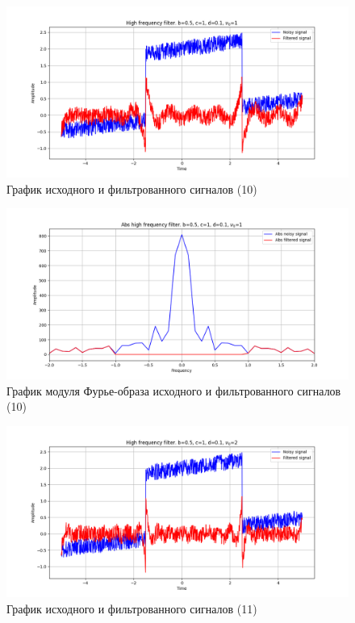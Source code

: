 \documentclass[a4paper, 12pt]{article}
\begin{document}
    \begin{figure}[!htb]
        \centering
        \includegraphics[scale=0.48]{10_u_flt_u_nolow.png}
        \captionsetup{skip=0pt}
        \caption{График исходного и фильтрованного сигналов (10)}
        \label{fig:fig45}
    \end{figure}
    \begin{figure}[!htb]
        \centering
        \includegraphics[scale=0.48]{10_abs_u_U_nolow.png}
        \captionsetup{skip=0pt}
        \caption{График модуля Фурье-образа исходного и фильтрованного сигналов (10)}
        \label{fig:fig46}
    \end{figure}
    \newpage
    \begin{figure}[!htb]
        \centering
        \includegraphics[scale=0.48]{11_u_flt_u_nolow.png}
        \captionsetup{skip=0pt}
        \caption{График исходного и фильтрованного сигналов (11)}
        \label{fig:fig47}
    \end{figure}
\end{document}
